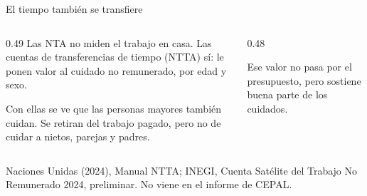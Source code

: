 \documentclass[aspectratio=169,11pt]{beamer}
\newcommand{\fuente}[1]{\par\vfill{\small\color{cGris}#1\par}}
\begin{document}
\begin{frame}{El tiempo también se transfiere}
  \begin{columns}[T]
    \begin{column}{0.49\textwidth}
      Las NTA no miden el trabajo en casa. Las cuentas de transferencias de tiempo (NTTA) sí: le ponen valor al cuidado no remunerado, por edad y sexo.
      \pause
      \par\medskip
      Con ellas se ve que las personas mayores también cuidan. Se retiran del trabajo pagado, pero no de cuidar a nietos, parejas y padres.
    \end{column}
    \begin{column}{0.48\textwidth}
      \pause
      \par\smallskip
      Ese valor no pasa por el presupuesto, pero sostiene buena parte de los cuidados.
    \end{column}
  \end{columns}
  \fuente{Naciones Unidas (2024), Manual NTTA; INEGI, Cuenta Satélite del Trabajo No Remunerado 2024, preliminar. No viene en el informe de CEPAL.}
\end{frame}
\end{document}
